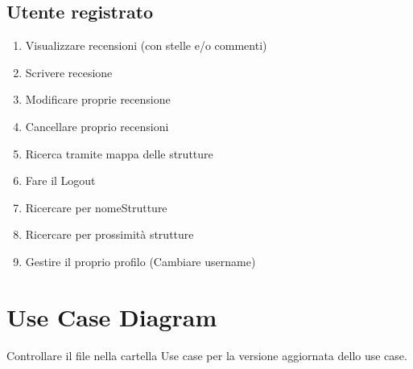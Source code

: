 \documentclass{article}
\begin{document}
 \subsection{Utente registrato} 
 \begin{enumerate}
    \item Visualizzare recensioni (con stelle e/o commenti)
    \item Scrivere recesione
    \item Modificare proprie recensione
    \item Cancellare proprio recensioni
    \item Ricerca tramite mappa delle strutture
    \item Fare il Logout
    \item Ricercare per nomeStrutture 
    \item Ricercare per prossimità strutture 
    \item Gestire il proprio profilo (Cambiare username)
 \end{enumerate}

 \section{Use Case Diagram}
 Controllare il file nella cartella Use case per la versione aggiornata dello use case.
 
\end{document}
